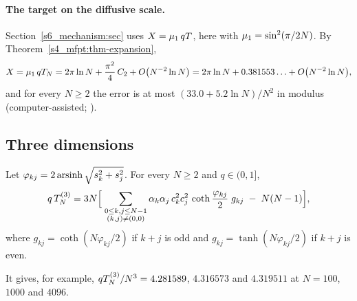 \paragraph{The target on the diffusive scale.}
Section~\ref{s6_mechanism:sec} uses $X=\mu_{1}\,qT$, here with $\mu_{1}=\sin^{2}(\pi/2N)$. By
Theorem~\ref{s4_mfpt:thm-expansion},
\begin{equation}\label{s4_mfpt:eq-X2d}
  X=\mu_{1}\,qT_{N}=2\pi\ln N+\frac{\pi^{2}}{4}\,C_{2}+O\bigl(N^{-2}\ln N\bigr)=2\pi\ln N+0.381553\ldots+O\bigl(N^{-2}\ln N\bigr),
\end{equation}
and for every $N\ge2$ the error is at most $(33.0+5.2\ln N)/N^{2}$ in modulus (computer-assisted; ).

\subsection{Three dimensions}\label{s4_mfpt:ssec-3d}

\begin{proposition}[Double sum for opposite corners, $\dd=3$]\label{s4_mfpt:prop-3d}
Let $\varphi_{kj}=2\operatorname{arsinh}\sqrt{s_{k}^{2}+s_{j}^{2}}$. For every $N\ge2$ and $q\in(0,1]$,
\begin{equation}\label{s4_mfpt:eq-3d}
  q\,T_{N}^{(3)}=3N\Bigl[\;\sum_{\substack{0\le k,j\le N-1\\ (k,j)\ne(0,0)}}\alpha_{k}\alpha_{j}\,c_{k}^{2}c_{j}^{2}\,
  \coth\frac{\varphi_{kj}}{2}\;g_{kj}\;-\;N(N-1)\Bigr],
\end{equation}
where $g_{kj}=\coth(N\varphi_{kj}/2)$ if $k+j$ is odd and $g_{kj}=\tanh(N\varphi_{kj}/2)$ if $k+j$ is even.
\end{proposition}

It gives, for example, $qT_{N}^{(3)}/N^{3}=4.281589$, $4.316573$ and $4.319511$ at $N=100$, $1000$ and $4096$.

